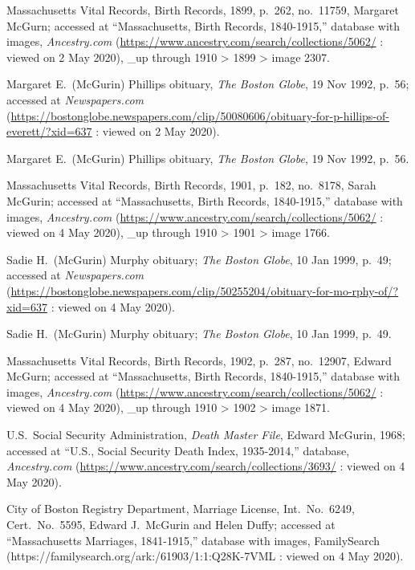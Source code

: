 \begin{thebibliography}{999}
Massachusetts Vital Records, Birth Records, 1899, p.\ 262, no.\ 11759, Margaret McGurn; accessed at ``Massachusetts, Birth Records, 1840-1915,'' database with images, \textit{Ancestry.com} (\url{https://www.ancestry.com/search/collections/5062/} : viewed on 2 May 2020), \_up through 1910 > 1899 > image 2307.

Margaret E.\ (McGurin) Phillips obituary, \textit{The Boston Globe}, 19 Nov 1992, p.\ 56; accessed at \textit{Newspapers.com} 
(\url{https://bostonglobe.newspapers.com/clip/50080606/obituary-for-p-hillips-of-everett/?xid=637} : viewed on 2 May 2020).

Margaret E.\ (McGurin) Phillips obituary, \textit{The Boston Globe}, 19 Nov 1992, p.\ 56.

Massachusetts Vital Records, Birth Records, 1901, p.\ 182, no.\ 8178, Sarah McGurin; accessed at ``Massachusetts, Birth Records, 1840-1915,'' database with images, \textit{Ancestry.com} (\url{https://www.ancestry.com/search/collections/5062/} : viewed on 4 May 2020), \_up through 1910 > 1901 > image 1766.

Sadie H.\ (McGurin) Murphy obituary; \textit{The Boston Globe}, 10 Jan 1999, p.\ 49; accessed at \textit{Newspapers.com} (\url{https://bostonglobe.newspapers.com/clip/50255204/obituary-for-mo-rphy-of/?xid=637} : viewed on 4 May 2020).

Sadie H.\ (McGurin) Murphy obituary; \textit{The Boston Globe}, 10 Jan 1999, p.\ 49.

Massachusetts Vital Records, Birth Records, 1902, p.\ 287, no.\ 12907, Edward McGurn; accessed at ``Massachusetts, Birth Records, 1840-1915,'' database with images, \textit{Ancestry.com} (\url{https://www.ancestry.com/search/collections/5062/} : viewed on 4 May 2020), \_up through 1910 > 1902 > image 1871.

U.S.\ Social Security Administration, \textit{Death Master File}, Edward McGurin, 1968; accessed at ``U.S., Social Security Death Index, 1935-2014,'' database, \textit{Ancestry.com} (\url{https://www.ancestry.com/search/collections/3693/} : viewed on 4 May 2020).

City of Boston Registry Department, Marriage License, Int.\ No.\ 6249, Cert.\ No.\ 5595, Edward J.\ McGurin and Helen Duffy; accessed at ``Massachusetts Marriages, 1841-1915,'' database with images, FamilySearch (https://familysearch.org/ark:/61903/1:1:Q28K-7VML : viewed on 4 May 2020).


\end{thebibliography}
